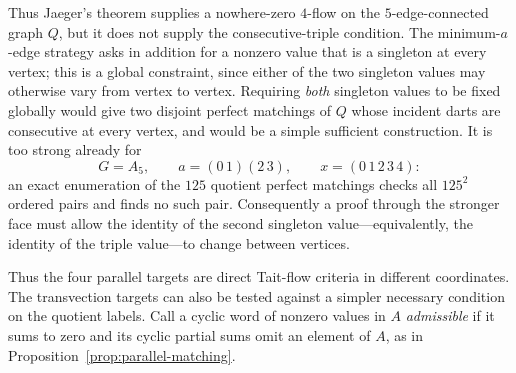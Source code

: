 \documentclass[11pt,a4paper]{article}
\theoremstyle{definition}
\theoremstyle{remark}
\begin{document}
Thus Jaeger's theorem supplies a nowhere-zero $4$-flow on the $5$-edge-connected graph $Q$, but it does not supply the consecutive-triple condition.  The minimum-$a$-edge strategy asks in addition for a nonzero value that is a singleton at every vertex; this is a global constraint, since either of the two singleton values may otherwise vary from vertex to vertex.  Requiring \emph{both} singleton values to be fixed globally would give two disjoint perfect matchings of $Q$ whose incident darts are consecutive at every vertex, and would be a simple sufficient construction.  It is too strong already for
\[
 G=A_5,\qquad a=(0\,1)(2\,3),\qquad x=(0\,1\,2\,3\,4):
\]
an exact enumeration of the $125$ quotient perfect matchings checks all $125^2$ ordered pairs and finds no such pair.  Consequently a proof through the stronger face must allow the identity of the second singleton value---equivalently, the identity of the triple value---to change between vertices.

Thus the four parallel targets are direct Tait-flow criteria in different coordinates.  The transvection targets can also be tested against a simpler necessary condition on the quotient labels.  Call a cyclic word of nonzero values in $A$ \emph{admissible} if it sums to zero and its cyclic partial sums omit an element of $A$, as in Proposition~\ref{prop:parallel-matching}.
\end{document}
